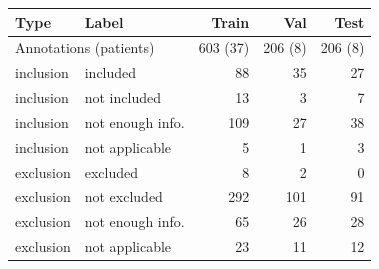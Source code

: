 \begin{tabular}{llrrr}\toprule Type & Label & Train & Val & Test\\\midrule
\multicolumn{2}{l}{Annotations (patients)} & 603 (37) & 206 (8) & 206 (8)\\
inclusion & included & 88 & 35 & 27\\
inclusion & not included & 13 & 3 & 7\\
inclusion & not enough info. & 109 & 27 & 38\\
inclusion & not applicable & 5 & 1 & 3\\
exclusion & excluded & 8 & 2 & 0\\
exclusion & not excluded & 292 & 101 & 91\\
exclusion & not enough info. & 65 & 26 & 28\\
exclusion & not applicable & 23 & 11 & 12\\
\bottomrule\end{tabular}